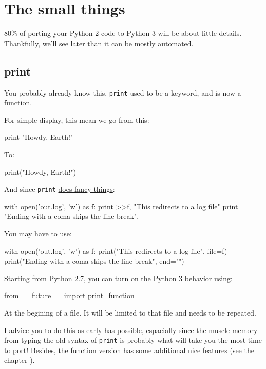 
\chapter{The small things}

80\% of porting your Python 2 code to Python 3 will be about little details. Thankfully, we'll see later than it can be mostly automated.

\section{print}

You probably already know this, \lstinline{print} used to be a keyword, and is now a function.

For simple display, this mean we go from this:

\begin{py}
print "Howdy, Earth!"
\end{py}


To:

\begin{py}
print("Howdy, Earth!")
\end{py}

And since \lstinline{print} \href{https://www.python.org/dev/peps/pep-0214/}{does fancy things}:

\begin{py}
with open('out.log', 'w') as f:
    print >>f, "This redirects to a log file"
print "Ending with a coma skips the line break",
\end{py}

You may have to use:

\begin{py}
with open('out.log', 'w') as f:
    print("This redirects to a log file", file=f)
print("Ending with a coma skips the line break", end="")
\end{py}

Starting from Python 2.7, you can turn on the Python 3 behavior using:

\begin{py}
from __future__ import print_function
\end{py}

At the begining of a file. It will be limited to that file and needs to be repeated.

I advice you to do this as early has possible, espacially since the muscle memory from typing the old syntax of \lstinline{print} is probably what will take you the most time to port! Besides, the function version has some additional nice features (see the chapter ).


